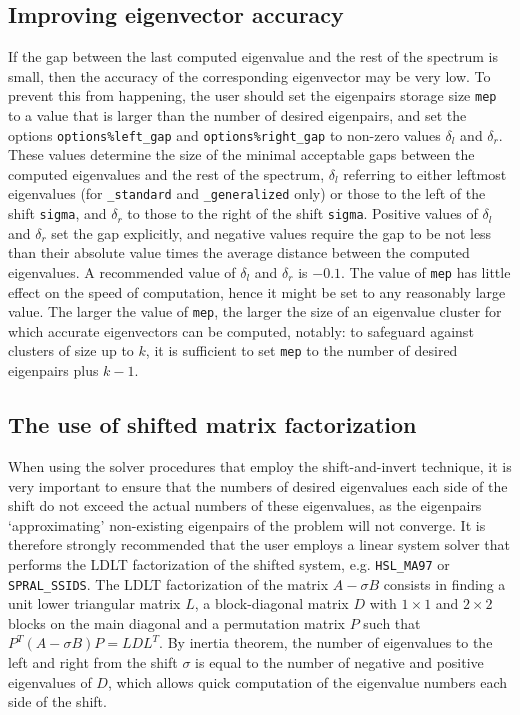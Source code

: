 \subsection{Improving eigenvector accuracy}

If the gap %
between the last computed eigenvalue 
and the rest of the spectrum is small,
then the accuracy of the corresponding eigenvector may be very low.
To prevent this from happening,
the user should set the eigenpairs storage size {\tt mep}
to a value that is larger than the number of desired eigenpairs,
and set the options 
{\tt options\%left\_gap}
and
{\tt options\%right\_gap}
to non-zero values $\delta_l$ and $\delta_r$.
These values
determine the size of the minimal acceptable gaps
between the computed eigenvalues and the rest of the spectrum,
$\delta_l$ referring to either leftmost eigenvalues
(for {\tt \solver\_standard} and {\tt \solver\_generalized} only)
or those to the left of the shift {\tt sigma},
and $\delta_r$
to those to the right of the shift {\tt sigma}.
Positive values of $\delta_l$ and $\delta_r$
set the gap explicitly,
and negative values
require the gap to be not less than their absolute value times
the average distance between the computed eigenvalues.
A recommended value of $\delta_l$ and $\delta_r$ is $-0.1$.
The value of {\tt mep} %
has little effect on
the speed of computation,
hence it might be set to any reasonably large value.
The larger the value of {\tt mep}, 
the larger the size of an eigenvalue cluster
for which accurate eigenvectors can be computed, notably:
to safeguard against clusters of size up to $k$,
it is sufficient to set {\tt mep} to the number of desired eigenpairs
plus $k - 1$.

\subsection{The use of shifted matrix factorization}
\label{sec:si}

When using the solver procedures that employ the shift-and-invert technique,
it is very important to ensure that the numbers of desired eigenvalues
each side of the shift do not exceed the actual numbers of these eigenvalues,
as the eigenpairs `approximating' non-existing eigenpairs of the problem
will not converge.
It is therefore strongly recommended that the user employs 
a linear system solver that performs
the LDLT
factorization of %
the shifted system,
e.g. {\tt HSL\_MA97} or {\tt SPRAL\_SSIDS}.
The LDLT factorization of the matrix
$A - \sigma B$ consists in finding a unit lower triangular
matrix $L$, a block-diagonal matrix $D$
with $1\times 1$ and $2\times 2$ blocks on the main diagonal
and a permutation matrix $P$
such that $P^T(A - \sigma B)P = L D L^T$.
By inertia theorem,
the number of eigenvalues to the left and right from 
the shift $\sigma$
is equal to the number of negative and positive eigenvalues of $D$,
which allows quick computation of the eigenvalue numbers
each side of the shift. %

